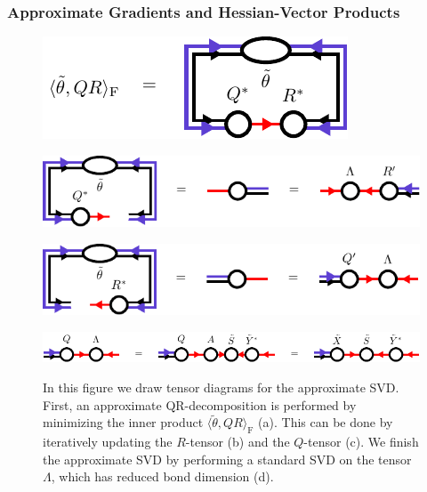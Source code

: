 \subsubsection*{\hspace{70pt}Approximate Gradients and Hessian-Vector Products}
\begin{figure}
	\centering
	\subcaptionbox{\label{fig:approximate_svd_overlap}}
	{%
		\includegraphics[scale=1]{figures/tikz/YB_isoTPS/approximate_svd/approximate_svd_a.pdf}
	}
	\par\bigskip
	\subcaptionbox{\label{fig:approximate_svd_first_step}}
	{%
		\includegraphics[scale=1]{figures/tikz/YB_isoTPS/approximate_svd/approximate_svd_b.pdf}
	}
	\par\bigskip
	\subcaptionbox{\label{fig:approximate_svd_second_step}}
	{%
		\includegraphics[scale=1]{figures/tikz/YB_isoTPS/approximate_svd/approximate_svd_c.pdf}
	}
	\par\bigskip
	\subcaptionbox{\label{fig:approximate_svd_final_step}}
	{%
		\includegraphics[scale=1]{figures/tikz/YB_isoTPS/approximate_svd/approximate_svd_d.pdf}
	}
	\caption{In this figure we draw tensor diagrams for the approximate SVD. First, an approximate QR-decomposition is performed by minimizing the inner product $\langle\tilde{\theta},QR\rangle_\text{F}$ (a). This can be done by iteratively updating the $R$-tensor (b) and the $Q$-tensor (c). We finish the approximate SVD by performing a standard SVD on the tensor $\Lambda$, which has reduced bond dimension (d).}
	\label{fig:approximate_qr_decomposition}
\end{figure}
